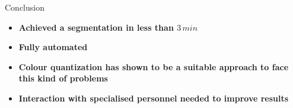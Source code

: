 \documentclass{standalone}
\begin{document}
	\begin{frame}{Conclusion}{}
		\begin{block}{}
			
			\centering
			\begin{itemize}\setlength\itemsep{0.5em}
				\item \textbf{Achieved a segmentation in less than $3\,min$}
				\item \textbf{Fully automated}
				\item \textbf{Colour quantization has shown to be a suitable approach to face this kind of problems}
				\item \textbf{Interaction with specialised personnel needed to improve results}
			\end{itemize}
		\end{block}
	\end{frame}
\end{document}
